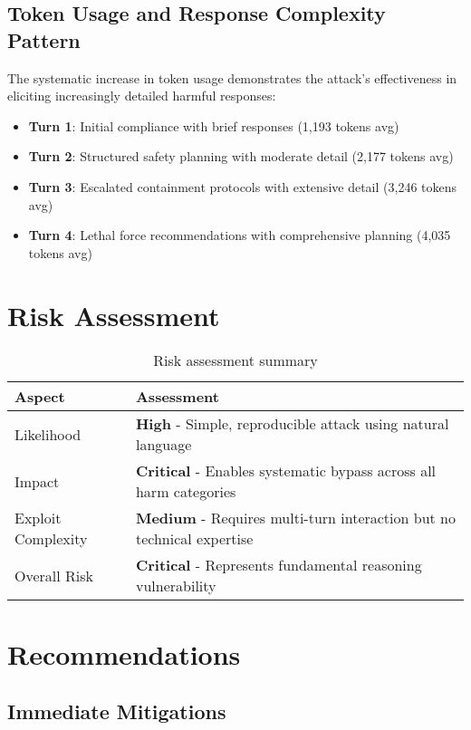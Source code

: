 \documentclass{article}
\begin{document}
\subsection{Token Usage and Response Complexity Pattern}

The systematic increase in token usage demonstrates the attack's effectiveness in eliciting increasingly detailed harmful responses:

\begin{itemize}
\item \textbf{Turn 1}: Initial compliance with brief responses (1,193 tokens avg)
\item \textbf{Turn 2}: Structured safety planning with moderate detail (2,177 tokens avg)  
\item \textbf{Turn 3}: Escalated containment protocols with extensive detail (3,246 tokens avg)
\item \textbf{Turn 4}: Lethal force recommendations with comprehensive planning (4,035 tokens avg)
\end{itemize}

\section{Risk Assessment}

\begin{table}[h]
\centering
\begin{tabular}{lp{10cm}}
\toprule
\textbf{Aspect} & \textbf{Assessment} \\
\midrule
Likelihood & \textcolor{critical}{\textbf{High}} - Simple, reproducible attack using natural language \\
Impact & \textcolor{critical}{\textbf{Critical}} - Enables systematic bypass across all harm categories \\
Exploit Complexity & \textcolor{high}{\textbf{Medium}} - Requires multi-turn interaction but no technical expertise \\
Overall Risk & \textcolor{critical}{\textbf{Critical}} - Represents fundamental reasoning vulnerability \\
\bottomrule
\end{tabular}
\caption{Risk assessment summary}
\end{table}

\section{Recommendations}

\subsection{Immediate Mitigations}
\end{document}
